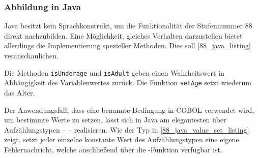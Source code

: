 \subsubsection*{Abbildung in Java}
Java besitzt kein Sprachkonstrukt, um die Funktionalität der Stufennummer 88 direkt nachzubilden. Eine Möglichkeit, gleiches Verhalten darzustellen bietet allerdings die Implementierung spezieller Methoden. Dies soll \autoref{88_java_listing} veranschaulichen.


Die Methoden \texttt{isUnderage} und \texttt{isAdult} geben einen Wahrheitswert in Abhängigkeit des Variablenwertes zurück. Die Funktion \texttt{setAge} setzt wiederum das Alter.

Der Anwendungsfall, dass eine benannte Bedingung in COBOL verwendet wird, um bestimmte Werte zu setzen, lässt sich in Java am elegantesten über Aufzählungstypen --  -- realisieren. Wie der Typ  in \autoref{88_java_value_set_listing} zeigt, setzt jeder einzelne konstante Wert des Aufzählungstypen eine eigene Fehlernachricht, welche anschließend über die -Funktion verfügbar ist.

